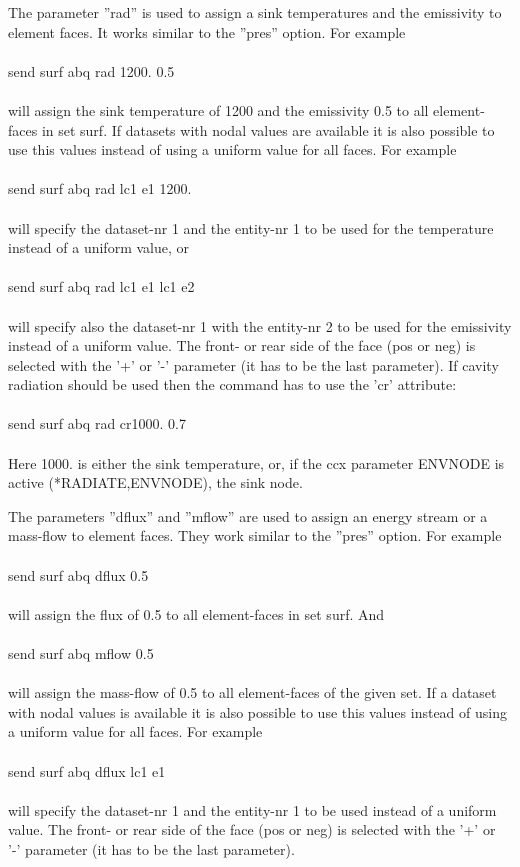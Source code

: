 \documentclass{article}
\begin{document}
The parameter ''rad'' is used to assign a sink temperatures and the emissivity to element faces. It works similar to the ''pres'' option. For example\\\\send surf abq rad 1200. 0.5\\\\will assign the sink temperature of 1200 and the emissivity 0.5 to all element-faces in set surf. If datasets with nodal values are available it is also possible to use this values instead of using a uniform value for all faces. For example\\\\send surf abq rad lc1 e1 1200.\\\\will specify the dataset-nr 1 and the entity-nr 1 to be used for the temperature instead of a uniform value, or \\\\send surf abq rad lc1 e1 lc1 e2\\\\will specify also the dataset-nr 1 with the entity-nr 2 to be used for the emissivity instead of a uniform value. The front- or rear side of the face (pos or neg) is selected with the '+' or '-' parameter (it has to be the last parameter). If cavity radiation should be used then the command has to use the 'cr' attribute:\\\\send surf abq rad cr1000. 0.7\\\\Here 1000. is either the sink temperature, or, if the ccx parameter ENVNODE is active (*RADIATE,ENVNODE), the sink node.

The parameters ''dflux'' and ''mflow'' are used to assign an energy stream or a mass-flow to element faces. They work similar to the ''pres'' option. For example\\\\send surf abq dflux 0.5\\\\will assign the flux of 0.5 to all element-faces in set surf. And\\\\send surf abq mflow 0.5\\\\will assign the mass-flow of 0.5 to all element-faces of the given set. If a dataset with nodal values is available it is also possible to use this values instead of using a uniform value for all faces. For example\\\\send surf abq dflux lc1 e1\\\\will specify the dataset-nr 1 and the entity-nr 1 to be used instead of a uniform value. The front- or rear side of the face (pos or neg) is selected with the '+' or '-' parameter (it has to be the last parameter).
\end{document}
